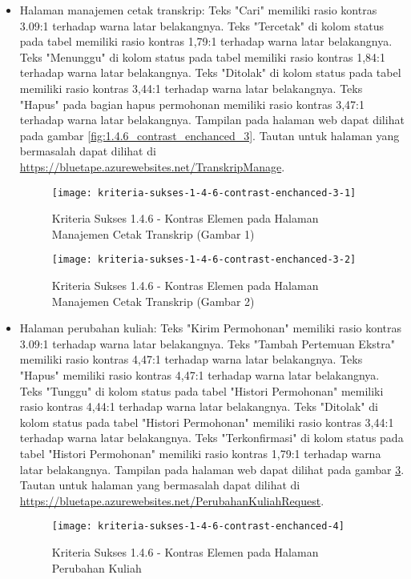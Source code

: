 \begin{itemize}
    \item Halaman manajemen cetak transkrip: Teks "Cari" memiliki rasio kontras 3.09:1 terhadap warna latar belakangnya. Teks "Tercetak" di kolom status pada tabel memiliki rasio kontras 1,79:1 terhadap warna latar belakangnya. Teks "Menunggu" di kolom status pada tabel memiliki rasio kontras 1,84:1 terhadap warna latar belakangnya. Teks "Ditolak" di kolom status pada tabel memiliki rasio kontras 3,44:1 terhadap warna latar belakangnya. Teks "Hapus" pada bagian hapus permohonan memiliki rasio kontras 3,47:1 terhadap warna latar belakangnya. Tampilan pada halaman web dapat dilihat pada gambar \ref{fig:1.4.6_contrast_enchanced_3}. Tautan untuk halaman yang bermasalah dapat dilihat di \url{https://bluetape.azurewebsites.net/TranskripManage}.
    \begin{figure}[H]
        \centering  
        \texttt{[image: kriteria-sukses-1-4-6-contrast-enchanced-3-1]}  
        \caption[Kriteria Sukses 1.4.6 - Kontras Elemen pada Halaman Manajemen Cetak Transkrip (Gambar 1)]{Kriteria Sukses 1.4.6 - Kontras Elemen pada Halaman Manajemen Cetak Transkrip (Gambar 1)}
        \label{fig:1.4.6_contrast_enchanced_3_1}  
    \end{figure} 
    
    \begin{figure}[H]
        \centering  
        \texttt{[image: kriteria-sukses-1-4-6-contrast-enchanced-3-2]}  
        \caption[Kriteria Sukses 1.4.6 - Kontras Elemen pada Halaman Manajemen Cetak Transkrip (Gambar 2)]{Kriteria Sukses 1.4.6 - Kontras Elemen pada Halaman Manajemen Cetak Transkrip (Gambar 2)}
        \label{fig:1.4.6_contrast_enchanced_3_2}  
    \end{figure} 

    \item Halaman perubahan kuliah: Teks "Kirim Permohonan" memiliki rasio kontras 3.09:1 terhadap warna latar belakangnya. Teks "Tambah Pertemuan Ekstra" memiliki rasio kontras 4,47:1 terhadap warna latar belakangnya. Teks "Hapus" memiliki rasio kontras 4,47:1 terhadap warna latar belakangnya. Teks "Tunggu" di kolom status pada tabel "Histori Permohonan" memiliki rasio kontras 4,44:1 terhadap warna latar belakangnya. Teks "Ditolak" di kolom status pada tabel "Histori Permohonan" memiliki rasio kontras 3,44:1 terhadap warna latar belakangnya. Teks "Terkonfirmasi" di kolom status pada tabel "Histori Permohonan" memiliki rasio kontras 1,79:1 terhadap warna latar belakangnya. Tampilan pada halaman web dapat dilihat pada gambar \ref{fig:1.4.6_contrast_enchanced_4}. Tautan untuk halaman yang bermasalah dapat dilihat di \url{https://bluetape.azurewebsites.net/PerubahanKuliahRequest}.
    \begin{figure}[H]
        \centering  
        \texttt{[image: kriteria-sukses-1-4-6-contrast-enchanced-4]}  
        \caption[Kriteria Sukses 1.4.6 - Kontras Elemen pada Halaman Perubahan Kuliah]{Kriteria Sukses 1.4.6 - Kontras Elemen pada Halaman Perubahan Kuliah}
        \label{fig:1.4.6_contrast_enchanced_4}  
    \end{figure} 
    

\end{itemize}

